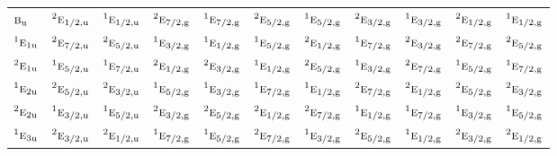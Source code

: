 \documentclass[10pt,a4paper]{article}
\numberwithin{equation}{section}
\newcommand{\irr}[1]{\text{\normalfont\scshape #1}}
\newcommand{\conjpair}[1]{{}^{#1}}
\newcommand{\ptag}[1]{\mathrm{#1}}
\begin{document}
{\begin{longtable}{@{}lcccccccccc@{}}
$\irr{b}_{\ptag{u}}$ & $\conjpair{2}\irr{e}_{1/2,\ptag{u}}$ & $\conjpair{1}\irr{e}_{1/2,\ptag{u}}$ & $\conjpair{2}\irr{e}_{7/2,\ptag{g}}$ & $\conjpair{1}\irr{e}_{7/2,\ptag{g}}$ & $\conjpair{2}\irr{e}_{5/2,\ptag{g}}$ & $\conjpair{1}\irr{e}_{5/2,\ptag{g}}$ & $\conjpair{2}\irr{e}_{3/2,\ptag{g}}$ & $\conjpair{1}\irr{e}_{3/2,\ptag{g}}$ & $\conjpair{2}\irr{e}_{1/2,\ptag{g}}$ & $\conjpair{1}\irr{e}_{1/2,\ptag{g}}$\\
$\conjpair{1}\irr{e}_{1\ptag{u}}$ & $\conjpair{2}\irr{e}_{7/2,\ptag{u}}$ & $\conjpair{2}\irr{e}_{5/2,\ptag{u}}$ & $\conjpair{1}\irr{e}_{3/2,\ptag{g}}$ & $\conjpair{1}\irr{e}_{1/2,\ptag{g}}$ & $\conjpair{1}\irr{e}_{5/2,\ptag{g}}$ & $\conjpair{2}\irr{e}_{1/2,\ptag{g}}$ & $\conjpair{1}\irr{e}_{7/2,\ptag{g}}$ & $\conjpair{2}\irr{e}_{3/2,\ptag{g}}$ & $\conjpair{2}\irr{e}_{7/2,\ptag{g}}$ & $\conjpair{2}\irr{e}_{5/2,\ptag{g}}$\\
$\conjpair{2}\irr{e}_{1\ptag{u}}$ & $\conjpair{1}\irr{e}_{5/2,\ptag{u}}$ & $\conjpair{1}\irr{e}_{7/2,\ptag{u}}$ & $\conjpair{2}\irr{e}_{1/2,\ptag{g}}$ & $\conjpair{2}\irr{e}_{3/2,\ptag{g}}$ & $\conjpair{1}\irr{e}_{1/2,\ptag{g}}$ & $\conjpair{2}\irr{e}_{5/2,\ptag{g}}$ & $\conjpair{1}\irr{e}_{3/2,\ptag{g}}$ & $\conjpair{2}\irr{e}_{7/2,\ptag{g}}$ & $\conjpair{1}\irr{e}_{5/2,\ptag{g}}$ & $\conjpair{1}\irr{e}_{7/2,\ptag{g}}$\\
$\conjpair{1}\irr{e}_{2\ptag{u}}$ & $\conjpair{2}\irr{e}_{5/2,\ptag{u}}$ & $\conjpair{2}\irr{e}_{3/2,\ptag{u}}$ & $\conjpair{1}\irr{e}_{5/2,\ptag{g}}$ & $\conjpair{1}\irr{e}_{3/2,\ptag{g}}$ & $\conjpair{1}\irr{e}_{7/2,\ptag{g}}$ & $\conjpair{1}\irr{e}_{1/2,\ptag{g}}$ & $\conjpair{2}\irr{e}_{7/2,\ptag{g}}$ & $\conjpair{2}\irr{e}_{1/2,\ptag{g}}$ & $\conjpair{2}\irr{e}_{5/2,\ptag{g}}$ & $\conjpair{2}\irr{e}_{3/2,\ptag{g}}$\\
$\conjpair{2}\irr{e}_{2\ptag{u}}$ & $\conjpair{1}\irr{e}_{3/2,\ptag{u}}$ & $\conjpair{1}\irr{e}_{5/2,\ptag{u}}$ & $\conjpair{2}\irr{e}_{3/2,\ptag{g}}$ & $\conjpair{2}\irr{e}_{5/2,\ptag{g}}$ & $\conjpair{2}\irr{e}_{1/2,\ptag{g}}$ & $\conjpair{2}\irr{e}_{7/2,\ptag{g}}$ & $\conjpair{1}\irr{e}_{1/2,\ptag{g}}$ & $\conjpair{1}\irr{e}_{7/2,\ptag{g}}$ & $\conjpair{1}\irr{e}_{3/2,\ptag{g}}$ & $\conjpair{1}\irr{e}_{5/2,\ptag{g}}$\\
$\conjpair{1}\irr{e}_{3\ptag{u}}$ & $\conjpair{2}\irr{e}_{3/2,\ptag{u}}$ & $\conjpair{2}\irr{e}_{1/2,\ptag{u}}$ & $\conjpair{1}\irr{e}_{7/2,\ptag{g}}$ & $\conjpair{1}\irr{e}_{5/2,\ptag{g}}$ & $\conjpair{2}\irr{e}_{7/2,\ptag{g}}$ & $\conjpair{1}\irr{e}_{3/2,\ptag{g}}$ & $\conjpair{2}\irr{e}_{5/2,\ptag{g}}$ & $\conjpair{1}\irr{e}_{1/2,\ptag{g}}$ & $\conjpair{2}\irr{e}_{3/2,\ptag{g}}$ & $\conjpair{2}\irr{e}_{1/2,\ptag{g}}$\\

\end{longtable}}
\end{document}
